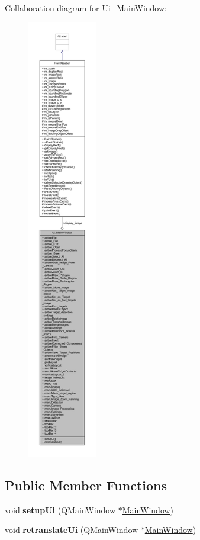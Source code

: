 Collaboration diagram for Ui\+\_\+\+Main\+Window\+:
\nopagebreak
\begin{figure}[H]
\begin{center}
\leavevmode
\includegraphics[height=550pt]{class_ui___main_window__coll__graph}
\end{center}
\end{figure}
\subsection*{Public Member Functions}
\begin{DoxyCompactItemize}
\item 
\mbox{\label{class_ui___main_window_acf4a0872c4c77d8f43a2ec66ed849b58}} 
void {\bfseries setup\+Ui} (Q\+Main\+Window $\ast$\hyperlink{class_main_window}{Main\+Window})
\item 
\mbox{\label{class_ui___main_window_a097dd160c3534a204904cb374412c618}} 
void {\bfseries retranslate\+Ui} (Q\+Main\+Window $\ast$\hyperlink{class_main_window}{Main\+Window})
\end{DoxyCompactItemize}
